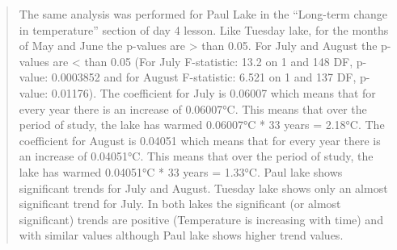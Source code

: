 \documentclass[]{article}
\begin{document}
\begin{quote}
The same analysis was performed for Paul Lake in the ``Long-term change
in temperature'' section of day 4 lesson. Like Tuesday lake, for the
months of May and June the p-values are \textgreater{} than 0.05. For
July and August the p-values are \textless{} than 0.05 (For July
F-statistic: 13.2 on 1 and 148 DF, p-value: 0.0003852 and for August
F-statistic: 6.521 on 1 and 137 DF, p-value: 0.01176). The coefficient
for July is 0.06007 which means that for every year there is an increase
of 0.06007°C. This means that over the period of study, the lake has
warmed 0.06007°C * 33 years = 2.18°C. The coefficient for August is
0.04051 which means that for every year there is an increase of
0.04051°C. This means that over the period of study, the lake has warmed
0.04051°C * 33 years = 1.33°C. Paul lake shows significant trends for
July and August. Tuesday lake shows only an almost significant trend for
July. In both lakes the significant (or almost significant) trends are
positive (Temperature is increasing with time) and with similar values
although Paul lake shows higher trend values.
\end{quote}
\end{document}
